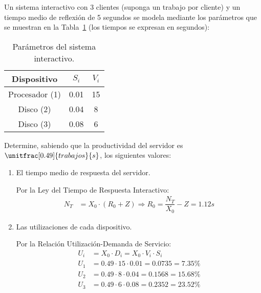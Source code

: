 \begin{ejercicio}\label{ej:5.25}
    Un sistema interactivo con 3 clientes (suponga un trabajo por cliente) y un tiempo medio de reflexión de 5 segundos se modela mediante los parámetros que se muestran en la Tabla~\ref{tab:5.25} (los tiempos se expresan en segundos):
    \begin{table}[h]
        \centering
        \begin{tabular}{|c|c|c|}
            \hline
            Dispositivo & $S_i$ & $V_i$ \\
            \hline
            Procesador (1) & 0.01 & 15 \\
            Disco (2) & 0.04 & 8 \\
            Disco (3) & 0.08 & 6 \\
            \hline
        \end{tabular}
        \caption{Parámetros del sistema interactivo.}
        \label{tab:5.25}
    \end{table}
    Determine, sabiendo que la productividad del servidor es $\unitfrac[0.49]{trabajos}{s}$, los siguientes valores:
    \begin{enumerate}
        \item El tiempo medio de respuesta del servidor.
        
        Por la Ley del Tiempo de Respuesta Interactivo:
        \begin{align*}
            N_T &= X_0 \cdot (R_0 + Z)
            \Longrightarrow R_0 = \dfrac{N_T}{X_0} - Z = 1.12 \unit{s}
        \end{align*}
        \item Las utilizaciones de cada dispositivo.
        
        Por la Relación Utilización-Demanda de Servicio:
        \begin{align*}
            U_i &= X_0 \cdot D_i
            = X_0 \cdot V_i \cdot S_i\\
            U_1 &= 0.49 \cdot 15 \cdot 0.01 = 0.0735 = 7.35\% \\
            U_2 &= 0.49 \cdot 8 \cdot 0.04 = 0.1568 = 15.68\% \\
            U_3 &= 0.49 \cdot 6 \cdot 0.08 = 0.2352 = 23.52\%
        \end{align*}
    \end{enumerate}
\end{ejercicio}
\begin{comment}
\solucion
    \begin{enumerate}
        \item $R_0 = 1.1$ s.
        \item $U_1 = 0.07$, $U_2 = 0.16$, $U_3 = 0.24$.
    \end{enumerate}
\end{comment}

